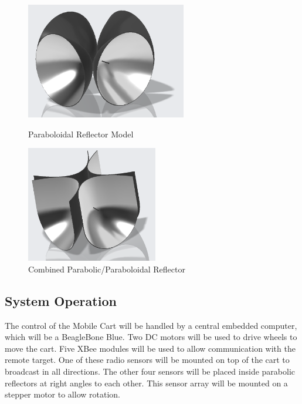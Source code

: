 \documentclass[letterpaper,12pt]{article}   %
\begin{document}
\begin{figure}[h!]
  \centering
  \begin{minipage}[t]{0.5\textwidth}
    \centering
    \includegraphics[height=2in]{figs/img/paraboloidalReflector}
    \captionsetup{width=\textwidth, justification=raggedright}
    \caption{Paraboloidal Reflector Model}
    \label{fig:parabolodialReflector}
  \end{minipage}
  \begin{minipage}[t]{0.4\textwidth}
    \centering
    \includegraphics[height=2in]{figs/img/parabolicReflector}
    \captionsetup{width=\textwidth, justification=raggedright}
    \caption{Combined Parabolic/Paraboloidal Reflector}
    \label{fig:parabolicReflector}
  \end{minipage}
\end{figure}

\subsection{System Operation}
The control of the Mobile Cart will be handled by a central embedded computer, which will be a BeagleBone Blue. Two DC motors will be used to drive wheels to move the cart. Five XBee modules will be used to allow communication with the remote target. One of these radio sensors will be mounted on top of the cart to broadcast in all directions. The other four sensors will be placed inside parabolic reflectors at right angles to each other. This sensor array will be mounted on a stepper motor to allow rotation. 
\end{document}
